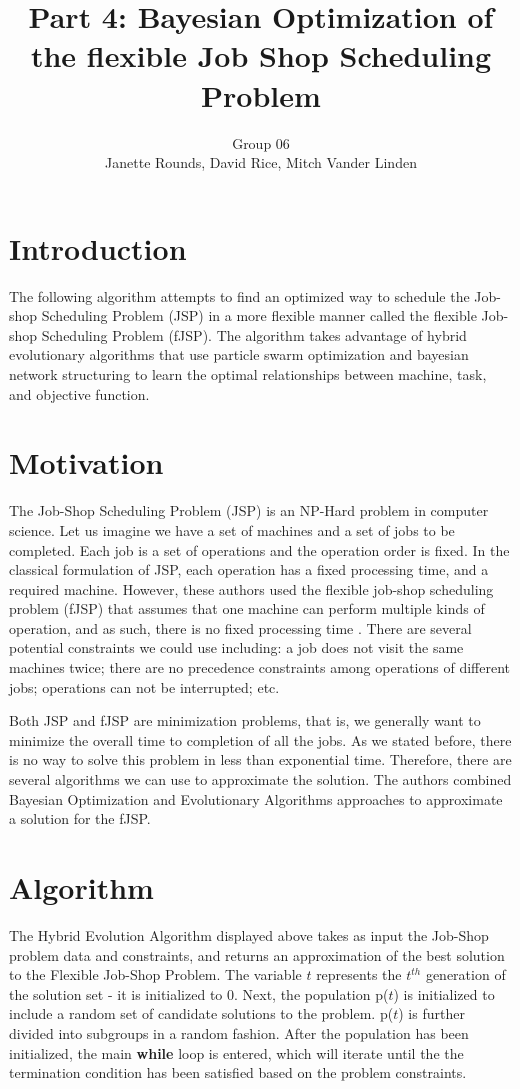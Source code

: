 \documentclass[11pt,twocolumn]{article}
\title{Part 4: Bayesian Optimization of the flexible Job Shop Scheduling Problem}
\author{Group 06 \\ 
\small Janette Rounds, \small David Rice, \small Mitch Vander Linden}
\begin{document}
\maketitle


\section{Introduction}
The following algorithm attempts to find an optimized way to schedule the Job-shop Scheduling Problem (JSP) in a more flexible manner called the flexible Job-shop Scheduling Problem (fJSP). The algorithm takes advantage of hybrid evolutionary algorithms that use particle swarm optimization and bayesian network structuring to learn the optimal relationships between machine, task, and objective function. 

\section{Motivation}
The Job-Shop Scheduling Problem (JSP) is an NP-Hard problem in computer science\cite{cheng1996tutorial}. Let us imagine we have a set of machines and a set of jobs to be completed. Each job is a set of operations and the operation order is fixed. In the classical formulation of JSP, each operation has a fixed processing time, and a required machine. However, these authors used the flexible job-shop scheduling problem (fJSP) that assumes that one machine can perform multiple kinds of operation, and as such, there is no fixed processing time \cite{sun2015bayesian}. There are several potential constraints we could use including: a job does not visit the same machines twice; there are no precedence constraints among operations of different jobs; operations can not be interrupted; etc. 

Both JSP and fJSP are minimization problems, that is, we generally want to minimize the overall time to completion of all the jobs. As we stated before, there is no way to solve this problem in less than exponential time. Therefore, there are several algorithms we can use to approximate the solution. The authors combined Bayesian Optimization and Evolutionary Algorithms approaches to approximate a solution for the fJSP. 

\section{Algorithm}
The Hybrid Evolution Algorithm displayed above takes as input the Job-Shop problem data and constraints, and returns an approximation of the best solution to the Flexible Job-Shop Problem. The variable $t$ represents the $t^{th}$ generation of the solution set - it is initialized to 0. Next, the population p($t$) is initialized to include a random set of candidate solutions to the problem. p($t$) is further divided into subgroups in a random fashion. After the population has been initialized, the main \textbf{while} loop is entered, which will iterate until the the termination condition has been satisfied based on the problem constraints.
\end{document}
